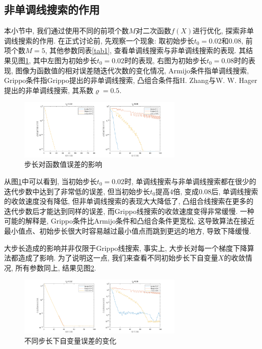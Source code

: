 \documentclass[UTF8]{ctexart}
\begin{document}
\subsection{非单调线搜索的作用}
本小节中, 我们通过使用不同的前项个数$M$对二次函数$f(X)$进行优化, 探索非单调线搜索的作用. 在正式讨论前, 先观察一个现象: 取初始步长$t_0=0.02$和$0.08$, 前项个数$M=5$, 其他参数同表\ref{tab1}, 查看单调线搜索与非单调线搜索的表现. 其结果见图\ref{fig3}, 其中左图为初始步长$t_0=0.02$时的表现, 右图为初始步长$t_0=0.08$时的表现, 图像为函数值的相对误差随迭代次数的变化情况, Armijo条件指单调线搜索, Grippo条件指Grippo提出的非单调线搜索, 凸组合条件指H. Zhang与W. W. Hager提出的非单调线搜索, 其系数$\varrho=0.5$. \par
\begin{figure}[htb]
    \centering
    \includegraphics[width=0.7\textwidth]{Q2-figure/3.png}
    \caption{步长对函数值误差的影响}\label{fig3}
\end{figure}
从图\ref{fig3}中可以看到, 当初始步长$t_0=0.02$时, 单调线搜索与非单调线搜索都在很少的迭代步数中达到了非常低的误差, 但当初始步长$t_0$提高$4$倍, 变成$0.08$后, 单调线搜索的收敛速度没有降低, 但非单调线搜索的表现大大降低了, 凸组合线搜索在更多的迭代步数后才能达到同样的误差, 而Grippo线搜索的收敛速度变得非常缓慢. 一种可能的解释是, Grippo条件比Armijo条件和凸组合条件更宽松, 这导致算法在接近最小值点、初始步长很大时容易越过最小值点而跳到更远的地方, 导致下降缓慢. \par
大步长造成的影响并非仅限于Grippo线搜索, 事实上, 大步长对每一个梯度下降算法都造成了影响. 为了说明这一点, 我们来查看不同初始步长下自变量$X$的收敛情况, 所有参数同上, 结果见图\ref{fig4}. \par
\begin{figure}[htb]
    \centering
    \includegraphics[width=0.7\textwidth]{Q2-figure/4.png}
    \caption{不同步长下自变量误差的变化}\label{fig4}
\end{figure}
\end{document}
